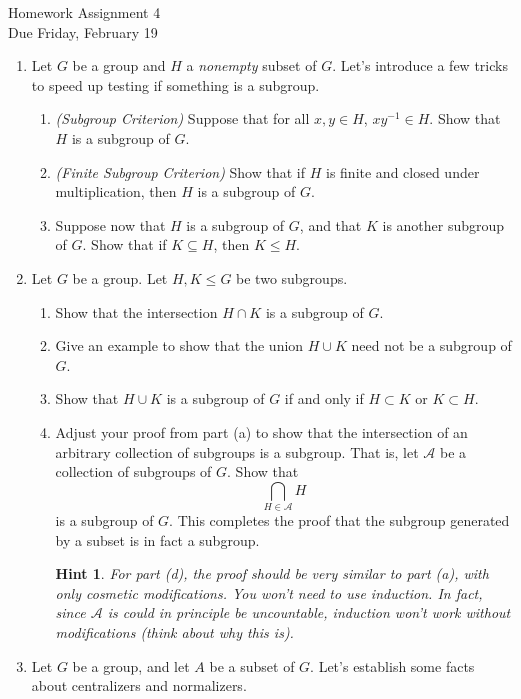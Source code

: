 \documentclass[11pt]{article}
\newtheorem*{hint}{Hint}
\newcommand{\cA}{\mathcal{A}}
\begin{document}
\begin{center}
\Large {Homework Assignment 4}\\
\small {Due Friday, February 19}
\end{center}
\begin{enumerate}
  \item Let $G$ be a group and $H$ a \textit{nonempty} subset of $G$.  Let's introduce a few tricks to speed up testing if something is a subgroup.
  \begin{enumerate}
    \item \textit{(Subgroup Criterion)} Suppose that for all $x,y\in H$, $xy^{-1}\in H$.  Show that $H$ is a subgroup of $G$.
    \item \textit{(Finite Subgroup Criterion)} Show that if $H$ is finite and closed under multiplication, then $H$ is a subgroup of $G$.
    \item Suppose now that $H$ is a subgroup of $G$, and that $K$ is another subgroup of $G$.  Show that if $K\subseteq H$, then $K\le H$.
  \end{enumerate}
	\item Let $G$ be a group.  Let $H,K\le G$ be two subgroups.
  \begin{enumerate}
    \item Show that the intersection $H\cap K$ is a subgroup of $G$.
    \item Give an example to show that the union $H\cup K$ need not be a subgroup of $G$.
    \item Show that $H\cup K$ is a subgroup of $G$ if and only if $H\subset K$ or $K\subset H$.
    \item Adjust your proof from part (a) to show that the intersection of an arbitrary collection of subgroups is a subgroup.  That is, let $\cA$ be a collection of subgroups of $G$.  Show that
    \[\bigcap_{H\in\cA}H\]
    is a subgroup of $G$.  This completes the proof that the subgroup generated by a subset is in fact a subgroup.
    \begin{hint}
      For part (d), the proof should be very similar to part (a), with only cosmetic modifications.  You won't need to use induction.  In fact, since $\cA$ is could in principle be uncountable, induction won't work without modifications (think about why this is).
    \end{hint}
  \end{enumerate}
  \item Let $G$ be a group, and let $A$ be a subset of $G$.  Let's establish some facts about centralizers and normalizers.

\end{enumerate}
\end{document}
